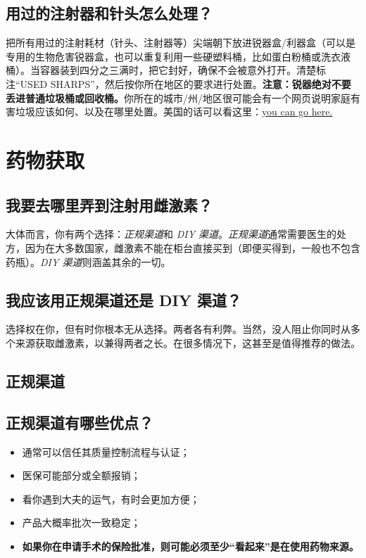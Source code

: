 \documentclass{article}
\begin{document}
\subsection{用过的注射器和针头怎么处理？}\label{5-27}

把所有用过的注射耗材（针头、注射器等）尖端朝下放进锐器盒/利器盒（可以是专用的生物危害锐器盒，也可以重复利用一些硬塑料桶，比如蛋白粉桶或洗衣液桶）。当容器装到四分之三满时，把它封好，确保不会被意外打开。清楚标注“USED SHARPS”，然后按你所在地区的要求进行处置。\textbf{注意：锐器绝对不要丢进普通垃圾桶或回收桶。}你所在的城市/州/地区很可能会有一个网页说明家庭有害垃圾应该如何、以及在哪里处置。美国的话可以看这里：\href{https://safeneedledisposal.org/}{you can go here.}

\section{药物获取}\label{sv}

\subsection{我要去哪里弄到注射用雌激素？}

大体而言，你有两个选择：\textit{正规渠道}和 \textit{DIY 渠道}。\textit{正规渠道}通常需要医生的处方，因为在大多数国家，雌激素不能在柜台直接买到（即便买得到，一般也不包含药瓶）。\textit{DIY 渠道}则涵盖其余的一切。

\subsection{我应该用正规渠道还是 DIY 渠道？}

选择权在你，但有时你根本无从选择。两者各有利弊。当然，没人阻止你同时从多个来源获取雌激素，以兼得两者之长。在很多情况下，这甚至是值得推荐的做法。

\subsection*{正规渠道}

\subsection{正规渠道有哪些优点？}

\begin{itemize}
  \item 通常可以信任其质量控制流程与认证；
  \item 医保可能部分或全额报销；
  \item 看你遇到大夫的运气，有时会更加方便；
  \item 产品大概率批次一致稳定；
  \item \textbf{如果你在申请手术的保险批准，则可能必须至少“看起来”是在使用药物来源。}
\end{itemize}
\end{document}
